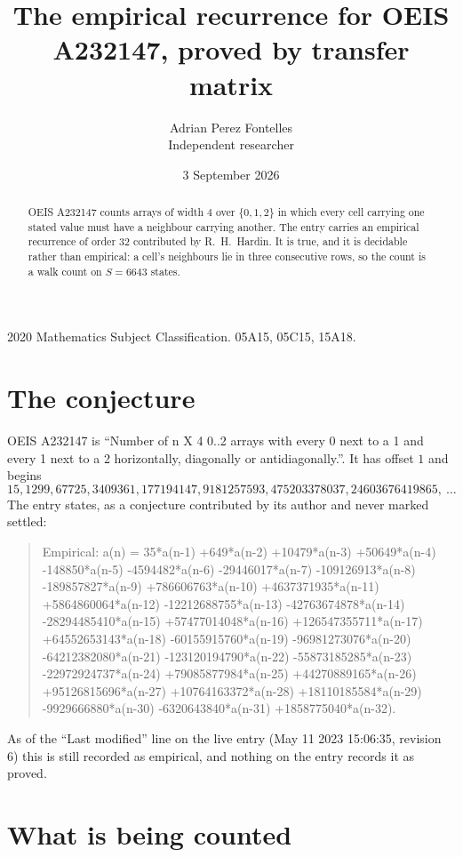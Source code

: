 \documentclass[11pt,a4paper]{article}
\title{The empirical recurrence for OEIS A232147, proved by transfer matrix}
\author{Adrian Perez Fontelles\\ \small Independent researcher}
\date{3 September 2026}
\theoremstyle{plain}
\theoremstyle{definition}
\begin{document}
\maketitle

\begin{abstract}
OEIS A232147 counts arrays of width $4$ over $\{0,1,2\}$ in which every cell carrying one stated
value must have a neighbour carrying another. The entry carries an empirical recurrence of
order $32$ contributed by R.~H.~Hardin. It is true, and it is decidable rather than
empirical: a cell's neighbours lie in three consecutive rows, so the count is a walk count on
$S=6643$ states.
\end{abstract}

\noindent\small 2020 Mathematics Subject Classification. 05A15, 05C15, 15A18.\normalsize

\section{The conjecture}

OEIS A232147 is ``Number of n X 4 0..2 arrays with every 0 next to a 1 and every 1 next to a 2 horizontally, diagonally or antidiagonally.''. It has offset $1$ and begins
\[
15, 1299, 67725, 3409361, 177194147, 9181257593, 475203378037, 24603676419865,\ \dots
\]
The entry states, as a conjecture contributed by its author and never marked settled:
\begin{quote}
Empirical: a(n) = 35*a(n-1) +649*a(n-2) +10479*a(n-3) +50649*a(n-4) -148850*a(n-5) -4594482*a(n-6) -29446017*a(n-7) -109126913*a(n-8) -189857827*a(n-9) +786606763*a(n-10) +4637371935*a(n-11) +5864860064*a(n-12) -12212688755*a(n-13) -42763674878*a(n-14) -28294485410*a(n-15) +57477014048*a(n-16) +126547355711*a(n-17) +64552653143*a(n-18) -60155915760*a(n-19) -96981273076*a(n-20) -64212382080*a(n-21) -123120194790*a(n-22) -55873185285*a(n-23) -22972924737*a(n-24) +79085877984*a(n-25) +44270889165*a(n-26) +95126815696*a(n-27) +10764163372*a(n-28) +18110185584*a(n-29) -9929666880*a(n-30) -6320643840*a(n-31) +1858775040*a(n-32).
\end{quote}
As of the ``Last modified'' line on the live entry (May 11 2023 15:06:35, revision 6) this is still
recorded as empirical, and nothing on the entry records it as proved.

\section{What is being counted}
\end{document}

